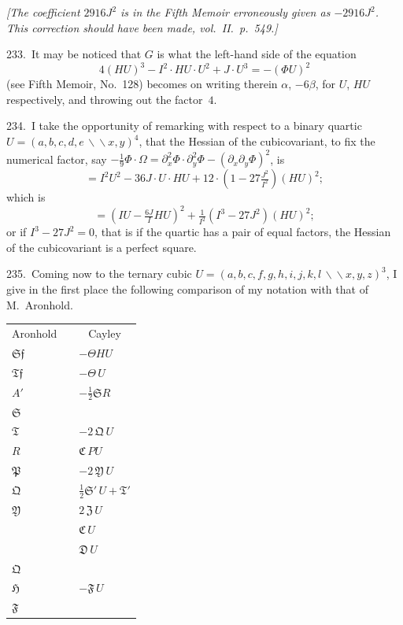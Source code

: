 \documentclass[11pt,a4paper]{article}
\theoremstyle{plain}
\theoremstyle{definition}
\theoremstyle{remark}
\begin{document}
\medskip
\textit{[The coefficient $2916J^2$ is in the Fifth Memoir erroneously given as $-2916J^2$. This correction should have been made, vol.~II.\ p.~549.]}

\newpage
\setcounter{page}{331}

233.\ It may be noticed that $G$ is what the left-hand side of the equation
\[
4(HU)^3-I^2\cdot HU\cdot U^2+J\cdot U^3 = -(\Phi U)^2
\]
(see Fifth Memoir, No.~128) becomes on writing therein $\alpha$, $-6\beta$, for $U$, $HU$ respectively, and throwing out the factor~$4$.

234.\ I take the opportunity of remarking with respect to a binary quartic $U=(a,b,c,d,e\,\backslash\!\!\backslash x,y)^4$, that the Hessian of the cubicovariant, to fix the numerical factor, say $-\tfrac{1}{9}\Phi\cdot\Omega = \partial_x^2\Phi\cdot\partial_y^2\Phi-(\partial_x\partial_y\Phi)^2$, is
\[
= I^2U^2-36J\cdot U\cdot HU+12\cdot(1-27\tfrac{J^2}{I^2})(HU)^2;
\]
which is
\[
= (IU-\tfrac{6J}{I}HU)^2+\tfrac{1}{I^2}(I^3-27J^2)(HU)^2;
\]
or if $I^3-27J^2=0$, that is if the quartic has a pair of equal factors, the Hessian of the cubicovariant is a perfect square.

235.\ Coming now to the ternary cubic $U=(a,b,c,f,g,h,i,j,k,l\,\backslash\!\!\backslash x,y,z)^3$, I give in the first place the following comparison of my notation with that of M.~Aronhold.

\begin{center}
\begin{tabular}{lcl}
\multicolumn{1}{c}{Aronhold} & \hspace{2cm} & \multicolumn{1}{c}{Cayley}\\
\addlinespace
$\mathfrak{S}\mathfrak{f}$ & & $-\Theta HU$ \\
$\mathfrak{T}\mathfrak{f}$ & & $-\Theta\,U$ \\
$A'$ & & $-\tfrac{1}{2}\mathfrak{S}R$ \\
$\mathfrak{S}$ & & \\
$\mathfrak{T}$ & & $-2\,\mathfrak{Q}\,U$ \\
$R$ & & $\mathfrak{C}\,PU$ \\
$\mathfrak{P}$ & & $-2\,\mathfrak{Y}\,U$ \\
$\mathfrak{Q}$ & & $\tfrac{1}{2}\mathfrak{S}'\,U+\mathfrak{T}'$ \\
$\mathfrak{Y}$ & & $2\,\mathfrak{Z}\,U$ \\
\addlinespace
& & $\mathfrak{C}\,U$ \\
& & $\mathfrak{D}\,U$ \\
$\mathfrak{Q}$ & & \\
$\mathfrak{H}$ & & $-\mathfrak{F}\,U$ \\
$\mathfrak{F}$ & & \\
\end{tabular}
\end{center}
\end{document}

